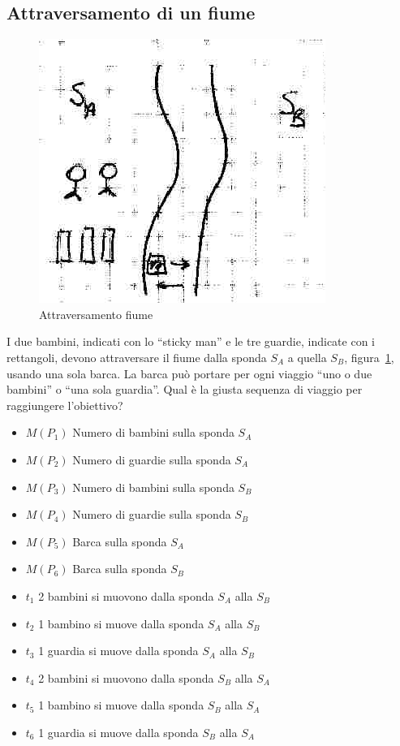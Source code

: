 \documentclass[a4paper]{report}
\begin{document}
\subsection{Attraversamento di un fiume}
\begin{figure}[!h]
  \begin{center}
    \includegraphics[scale=0.4]{./images/attraversamentoFiume01}
    \caption{Attraversamento fiume}\label{fig:attraversamentoFiume01}
  \end{center}
\end{figure} 
I due bambini, indicati con lo ``sticky man'' e le tre guardie,
indicate con i rettangoli, devono attraversare il fiume dalla sponda
$S_A$ a quella $S_B$, figura~\ref{fig:attraversamentoFiume01}, usando
una sola barca. La barca pu\`o portare per ogni viaggio ``uno o due
bambini'' o ``una sola guardia''. Qual \`e la giusta sequenza di
viaggio per raggiungere l'obiettivo?

\begin{itemize}
\item $M(P_1)$ Numero di bambini sulla sponda $S_A$
\item $M(P_2)$ Numero di guardie sulla sponda $S_A$
\item $M(P_3)$ Numero di bambini sulla sponda $S_B$
\item $M(P_4)$ Numero di guardie sulla sponda $S_B$
\item $M(P_5)$ Barca sulla sponda $S_A$
\item $M(P_6)$ Barca sulla sponda $S_B$
\end{itemize}

\begin{itemize}
\item $t_1$ 2 bambini si muovono dalla sponda $S_A$ alla $S_B$ 
\item $t_2$ 1 bambino si muove dalla sponda $S_A$ alla $S_B$ 
\item $t_3$ 1 guardia si muove dalla sponda $S_A$ alla $S_B$ 
\item $t_4$ 2 bambini si muovono dalla sponda $S_B$ alla $S_A$
\item $t_5$ 1 bambino si muove dalla sponda $S_B$ alla $S_A$
\item $t_6$ 1 guardia si muove dalla sponda $S_B$ alla $S_A$
\end{itemize}
\end{document}
